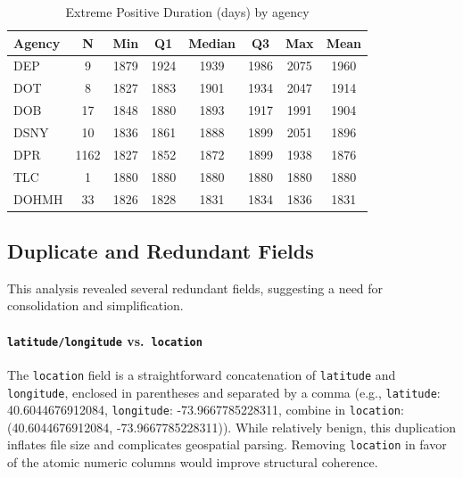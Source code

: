 \documentclass[linenumber]{jdsart}
\begin{document}
\begin{table}[tbp]
\centering
\caption{Extreme Positive Duration (days) by agency}
\label{tab:extreme-positive-days-agency}
\begin{tabular}{l
S[table-format=4.0]
S[table-format=4.0]
S[table-format=4.0]
S[table-format=4.0]
S[table-format=4.0]
S[table-format=4.0]
S[table-format=4.0]}
\toprule
\textbf{Agency} & \textbf{N} & \textbf{Min} & \textbf{Q1} &
\textbf{Median} & \textbf{Q3} & \textbf{Max} & \textbf{Mean} \\
\midrule
DEP & 9 & 1879 & 1924 & 1939 & 1986 & 2075 & 1960 \\
DOT & 8 & 1827 & 1883 & 1901 & 1934 & 2047 & 1914 \\
DOB & 17 & 1848 & 1880 & 1893 & 1917 & 1991 & 1904 \\
DSNY & 10 & 1836 & 1861 & 1888 & 1899 & 2051 & 1896 \\
DPR & 1162 & 1827 & 1852 & 1872 & 1899 & 1938 & 1876 \\
TLC & 1 & 1880 & 1880 & 1880 & 1880 & 1880 & 1880 \\
DOHMH & 33 & 1826 & 1828 & 1831 & 1834 & 1836 & 1831 \\
\bottomrule
\end{tabular}
\end{table}



\subsection{Duplicate and Redundant Fields}
\label{subsec:redundant}
This analysis revealed several redundant fields, suggesting a need for
consolidation and simplification.

\paragraph{\texttt{latitude/longitude} vs.~\texttt{location}}
The \texttt{location} field is a straightforward concatenation of
\texttt{latitude} and \texttt{longitude}, enclosed in parentheses and
separated by a comma
(e.g., \texttt{latitude}: 40.6044676912084, \texttt{longitude}: -73.9667785228311,
combine in \texttt{location}: (40.6044676912084, -73.9667785228311)).
While relatively benign, this duplication inflates file
size and complicates geospatial parsing. Removing
\texttt{location} in favor of the atomic numeric columns would improve
structural coherence.
\end{document}
